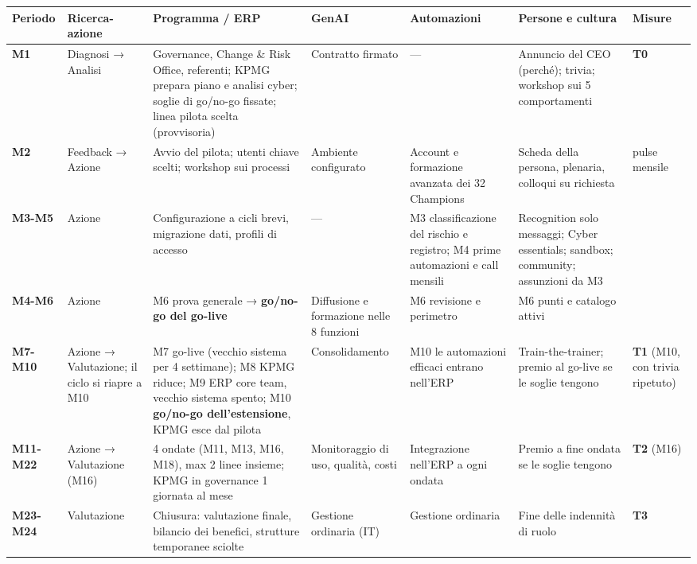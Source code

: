 \documentclass[11pt,a4paper]{article}
\begin{document}
{\footnotesize\renewcommand{\arraystretch}{1.25}
\begin{xltabular}{\linewidth}{@{}>{\raggedright\arraybackslash{}\hsize\hspace{0pt}}X>{\raggedright\arraybackslash{}\hsize\hspace{0pt}}X>{\raggedright\arraybackslash{}\hsize\hspace{0pt}}X>{\raggedright\arraybackslash{}\hsize\hspace{0pt}}X>{\raggedright\arraybackslash{}\hsize\hspace{0pt}}X>{\raggedright\arraybackslash{}\hsize\hspace{0pt}}X>{\raggedright\arraybackslash{}\hsize\hspace{0pt}}X@{}}
\toprule
\textbf{Periodo} & \textbf{Ricerca-azione} & \textbf{Programma / ERP} & \textbf{GenAI} & \textbf{Automazioni} & \textbf{Persone e cultura} & \textbf{Misure} \\
\midrule
\endhead
\textbf{M1} & Diagnosi → Analisi & Governance, Change \& Risk Office, referenti; KPMG prepara piano e analisi cyber; soglie di go/no-go fissate; linea pilota scelta (provvisoria) & Contratto firmato & — & Annuncio del CEO (perché); trivia; workshop sui 5 comportamenti & \textbf{T0} \\
\textbf{M2} & Feedback → Azione & Avvio del pilota; utenti chiave scelti; workshop sui processi & Ambiente configurato & Account e formazione avanzata dei 32 Champions & Scheda della persona, plenaria, colloqui su richiesta & pulse mensile \\
\textbf{M3-M5} & Azione & Configurazione a cicli brevi, migrazione dati, profili di accesso & — & M3 classificazione del rischio e registro; M4 prime automazioni e call mensili & Recognition solo messaggi; Cyber essentials; sandbox; community; assunzioni da M3 &  \\
\textbf{M4-M6} & Azione & M6 prova generale → \textbf{go/no-go del go-live} & Diffusione e formazione nelle 8 funzioni & M6 revisione e perimetro & M6 punti e catalogo attivi &  \\
\textbf{M7-M10} & Azione → Valutazione; il ciclo si riapre a M10 & M7 go-live (vecchio sistema per 4 settimane); M8 KPMG riduce; M9 ERP core team, vecchio sistema spento; M10 \textbf{go/no-go dell'estensione}, KPMG esce dal pilota & Consolidamento & M10 le automazioni efficaci entrano nell'ERP & Train-the-trainer; premio al go-live se le soglie tengono & \textbf{T1} (M10, con trivia ripetuto) \\
\textbf{M11-M22} & Azione → Valutazione (M16) & 4 ondate (M11, M13, M16, M18), max 2 linee insieme; KPMG in governance 1 giornata al mese & Monitoraggio di uso, qualità, costi & Integrazione nell'ERP a ogni ondata & Premio a fine ondata se le soglie tengono & \textbf{T2} (M16) \\
\textbf{M23-M24} & Valutazione & Chiusura: valutazione finale, bilancio dei benefici, strutture temporanee sciolte & Gestione ordinaria (IT) & Gestione ordinaria & Fine delle indennità di ruolo & \textbf{T3} \\
\bottomrule
\end{xltabular}}
\end{document}
